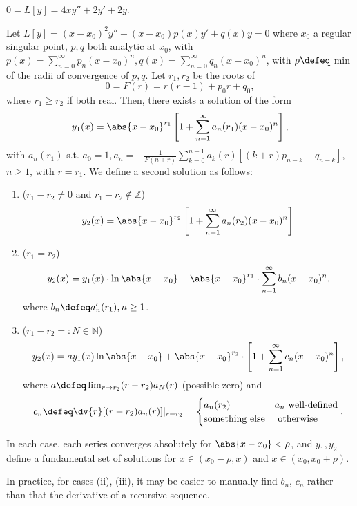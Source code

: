 \begin{example}
    $0 = L[y] = 4xy'' + 2y' + 2y$.
\end{example}


\begin{theorem}[Frobenius]
    Let $L[y] = (x-x_0)^2 y'' + (x-x_0)p(x)y' + q(x)y = 0$ where $x_0$ a regular singular point, $p, q$ both analytic at $x_0$, with $p(x) = \sum_{n=0}^\infty p_n(x-x_0)^n, q(x) = \sum_{n=0}^\infty q_n(x-x_0)^n$, with $\rho \defeq $ min of the radii of convergence of $p, q$. Let $r_1, r_2$ be the roots of \[
    0 = F(r) = r(r-1) + p_0 r + q_0,    
    \]
    where $r_1 \geq r_2$ if both real. Then, there exists a solution of the form \begin{align*}
        y_1(x) = \abs{x-x_0}^{r_1} \left[1 + \sum_{n=1}^\infty a_n (r_1) (x - x_0)^n\right],
    \end{align*}
    with $a_n(r_1)$ s.t. $a_0 = 1, a_n = - \frac{1}{F(n + r)} \sum_{k=0}^{n-1} a_k(r) \left[(k+r)p_{n-k}+q_{n-k}\right]$, $n \geq 1$, with $r = r_1$. We define a second solution as follows:
    \begin{enumerate}[label=(\roman*)]
        \item ($r_1 - r_2 \neq 0$ and $r_1 - r_2 \notin \mathbb{Z}$) \[
        y_2(x) = \abs{x - x_0}^{r_2} \left[1 + \sum_{n=1}^\infty a_n(r_2)(x-x_0)^n\right]    
        \]
        \item ($r_1 = r_2$)
        \[
        y_2(x) = y_1(x) \cdot \ln \abs{x - x_0} + \abs{x - x_0}^{r_1} \cdot \sum_{n=1}^\infty b_n (x-x_0)^n,    
        \]
        where $b_n \defeq a_n'(r_1), n \geq 1$.
        \item ($r_1 - r_2 =: N\in \mathbb{N}$)
        \[
        y_2(x) = a y_1(x) \ln \abs{x - x_0} + \abs{x - x_0}^{r_2} \cdot \left[1 + \sum_{n=1}^\infty c_n (x - x_0)^n\right]    ,
        \]
        where $a \defeq \lim_{r \to r_2} (r - r_2) a_N(r)$ (possible zero) and $$c_n \defeq \dv{r}[(r-r_2)a_n(r)]\vert_{r = r_2} = \begin{cases}
            a_n(r_2) & a_n \text{ well-defined}\\
            \text{something else} & \text{ otherwise}
        \end{cases}.$$
    \end{enumerate}
    In each case, each series converges absolutely for $\abs{x - x_0} < \rho$, and $y_1, y_2$ define a fundamental set of solutions for $x \in (x_0 - \rho, x)$ and $x \in (x_0, x_0 + \rho)$.
\end{theorem}

\begin{remark}
    In practice, for cases (ii), (iii), it may be easier to manually find $b_n$, $c_n$ rather than that the derivative of a recursive sequence.
\end{remark}
